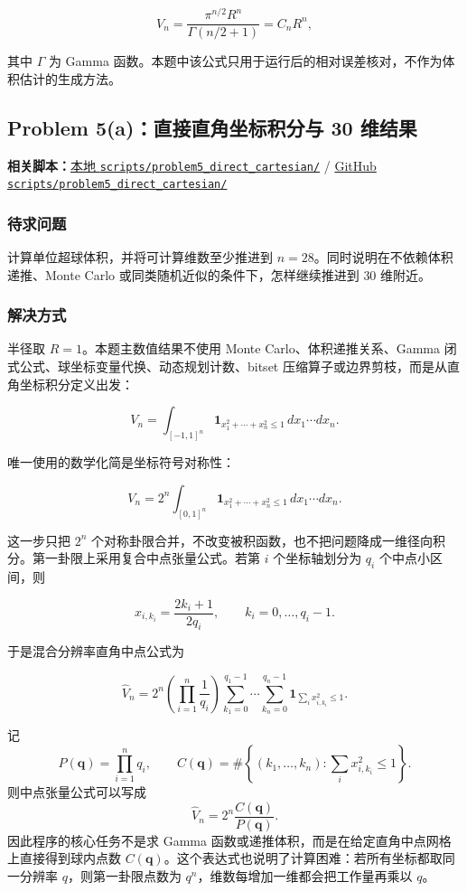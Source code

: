 \documentclass[12pt,a4paper,fontset=none]{ctexart}
\newcommand{\fileinline}[1]{{\urlstyle{same}\nolinkurl{#1}}}
\newcommand{\metadataline}[1]{#1}
\newcommand{\scriptpath}[1]{\fileinline{#1}}
\newcommand{\githubscriptsbase}{https://github.com/Void0312Aurora/computational-physics-homework-2026/blob/main/07/scripts}
\newcommand{\scriptlink}[1]{\noindent\metadataline{\textbf{相关脚本：}\href{../../../scripts/#1}{本地 \scriptpath{scripts/#1}} / \href{\githubscriptsbase/#1}{GitHub \scriptpath{scripts/#1}}}\par\medskip}
\begin{document}
\[
V_n=\frac{\pi^{n/2}R^n}{\Gamma(n/2+1)}=C_nR^n,
\]

其中 \(\Gamma\) 为 Gamma 函数。本题中该公式只用于运行后的相对误差核对，不作为体积估计的生成方法。

\subsection{Problem 5(a)：直接直角坐标积分与 30 维结果}\label{problem-5a}

\scriptlink{problem5_direct_cartesian/}

\subsubsection{待求问题}\label{ux5f85ux6c42ux95eeux9898-10}

计算单位超球体积，并将可计算维数至少推进到 \(n=28\)。同时说明在不依赖体积递推、Monte Carlo 或同类随机近似的条件下，怎样继续推进到 \(30\) 维附近。

\subsubsection{解决方式}\label{ux89e3ux51b3ux65b9ux5f0f-10}

半径取 \(R=1\)。本题主数值结果不使用 Monte Carlo、体积递推关系、Gamma 闭式公式、球坐标变量代换、动态规划计数、bitset 压缩算子或边界剪枝，而是从直角坐标积分定义出发：

\[
V_n=\int_{[-1,1]^n}\mathbf{1}_{x_1^2+\cdots+x_n^2\le 1}\,dx_1\cdots dx_n .
\]

唯一使用的数学化简是坐标符号对称性：

\[
V_n=2^n\int_{[0,1]^n}\mathbf{1}_{x_1^2+\cdots+x_n^2\le 1}\,dx_1\cdots dx_n .
\]

这一步只把 \(2^n\) 个对称卦限合并，不改变被积函数，也不把问题降成一维径向积分。第一卦限上采用复合中点张量公式。若第 \(i\) 个坐标轴划分为 \(q_i\) 个中点小区间，则

\[
x_{i,k_i}=\frac{2k_i+1}{2q_i},\qquad k_i=0,\ldots,q_i-1.
\]

于是混合分辨率直角中点公式为

\[
\widehat V_n
=2^n\left(\prod_{i=1}^n\frac{1}{q_i}\right)
\sum_{k_1=0}^{q_1-1}\cdots\sum_{k_n=0}^{q_n-1}
\mathbf{1}_{\sum_i x_{i,k_i}^2\le 1}.
\]

记
\[
P(\mathbf q)=\prod_{i=1}^n q_i,\qquad
C(\mathbf q)=
\#\left\{(k_1,\ldots,k_n):\sum_i x_{i,k_i}^2\le 1\right\}.
\]
则中点张量公式可以写成
\[
\widehat V_n=2^n\frac{C(\mathbf q)}{P(\mathbf q)}.
\]
因此程序的核心任务不是求 Gamma 函数或递推体积，而是在给定直角中点网格上直接得到球内点数
\(C(\mathbf q)\)。这个表达式也说明了计算困难：若所有坐标都取同一分辨率
\(q\)，则第一卦限点数为 \(q^n\)，维数每增加一维都会把工作量再乘以
\(q\)。
\end{document}
